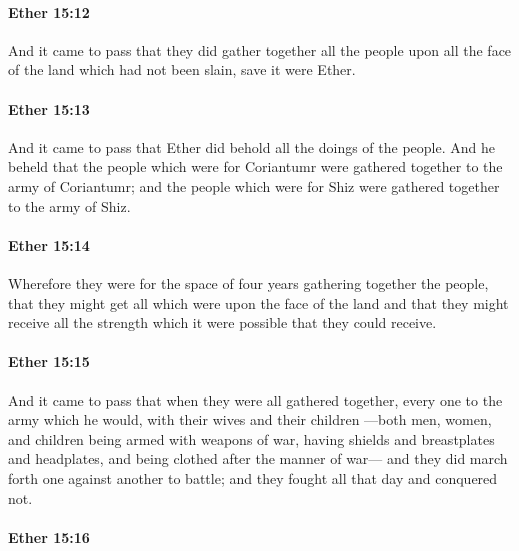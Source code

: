 		\paragraph{Ether 15:12} %
			\label{ETHER-15-12}

			And it came to pass that they did gather together
			all the people upon all the face of the land
			which had not been slain,
			save it were Ether.

		\paragraph{Ether 15:13} %
			\label{ETHER-15-13}

			And it came to pass that Ether did behold all the doings of the people.
			And he beheld that the people which were for Coriantumr
			were gathered together to the army of Coriantumr;
			and the people which were for Shiz
			were gathered together to the army of Shiz.

		\paragraph{Ether 15:14} %
			\label{ETHER-15-14}

			Wherefore they were for the space of four years gathering together the people,
			that they might get all which were upon the face of the land
			and that they might receive all the strength
			which it were possible that they could receive.

		\paragraph{Ether 15:15} %
			\label{ETHER-15-15}

			And it came to pass that when they were all gathered together,
			every one to the army which he would,
			with their wives and their children
			---both men, women, and children being armed with weapons of war,
			having shields and breastplates and headplates,
			and being clothed after the manner of war---
			and they did march forth one against another to battle;
			and they fought all that day and conquered not.

		\paragraph{Ether 15:16} %
			\label{ETHER-15-16}

